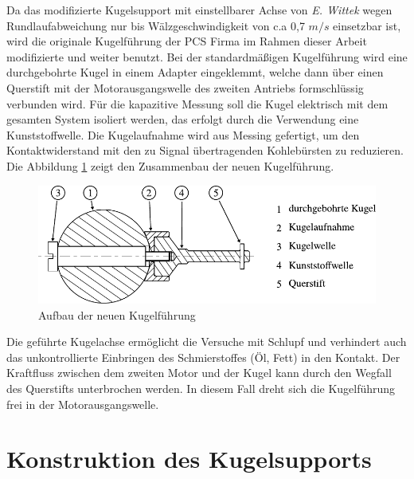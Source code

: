 Da das modifizierte Kugelsupport mit einstellbarer Achse von \textit{E. Wittek} \cite{wittek_2007} wegen Rundlaufabweichung nur bis Wälzgeschwindigkeit von c.a 0,7 $m/s$ einsetzbar ist, wird die originale Kugelführung der PCS Firma im Rahmen dieser Arbeit modifizierte und weiter benutzt.
Bei der standardmäßigen Kugelführung wird eine durchgebohrte Kugel in einem Adapter eingeklemmt, welche dann über einen Querstift mit der Motorausgangswelle des zweiten Antriebs formschlüssig verbunden wird.
Für die kapazitive Messung soll die Kugel elektrisch mit dem gesamten System isoliert werden, das erfolgt durch die Verwendung eine Kunststoffwelle.
Die Kugelaufnahme wird aus Messing gefertigt, um den Kontaktwiderstand mit den zu Signal übertragenden Kohlebürsten zu reduzieren.
Die Abbildung \ref{fig:aufbau_der_neuen_kugelfuehrung} zeigt den Zusammenbau der neuen Kugelführung.
\begin{figure}[htb]
    \centering
    \includegraphics[]{./images/durchgebohrte_kugel.pdf}
    \caption{Aufbau der neuen Kugelführung}
    \label{fig:aufbau_der_neuen_kugelfuehrung}
\end{figure}
%

Die geführte Kugelachse ermöglicht die Versuche mit Schlupf und verhindert auch das unkontrollierte Einbringen des Schmierstoffes (Öl, Fett) in den Kontakt.
Der Kraftfluss zwischen dem zweiten Motor und der Kugel kann durch den Wegfall des Querstifts unterbrochen werden.
In diesem Fall dreht sich die Kugelführung frei in der Motorausgangswelle.

\section{Konstruktion des Kugelsupports}
\label{sec:konstruktion_des_kugelsupports}

